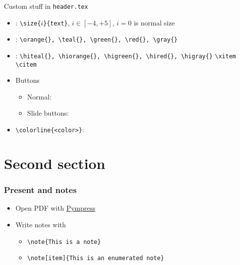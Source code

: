 \begin{frame}[fragile]{Custom stuff in \texttt{header.tex}}
\label{custom}
\begin{itemize}
\item {} : \verb|\size{|$i$\verb|}{text}|,\quad
    $i\in [-4, +5]$, $i=0$ is normal size
    \item {} : \verb|\orange{}, \teal{}, \green{}, \red{}, \gray{}|
    \item {} : \verb|\hiteal{}, \hiorange{}, \higreen{}, \hired{}, \higray{}|
    \xitem \verb|\xitem|
    \citem \texttt{\textbackslash citem}
    \item Buttons
        \begin{itemize}
            \item Normal:
            \item Slide buttons: 
        \end{itemize}
    \item \texttt{\textbackslash colorline\{<color>\}}:
\end{itemize}
\end{frame}


\section{Second section} %
\label{sec:sec2}

\begin{frame}       %
\frametitle{Present and notes}
\begin{itemize}
    \item Open PDF with \href{https://github.com/Cimbali/pympress}{Pympress} 
    \item Write notes with 
        \begin{itemize}
            \item \texttt{\textbackslash{}note\{This is a note\}}
            \item \texttt{\textbackslash{}note[item]\{This is an enumerated note\}}
        \end{itemize}
\end{itemize}
\end{frame}

